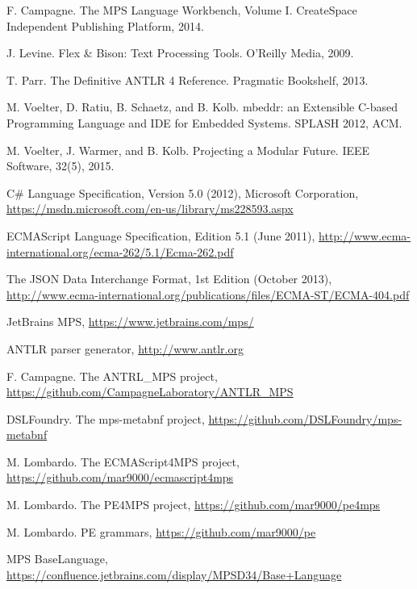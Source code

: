 \documentclass[preprint,10pt,numbers]{sigplanconf}
\begin{document}
\begin{thebibliography}{}

 F. Campagne. The MPS Language Workbench, Volume I. CreateSpace Independent Publishing Platform, 2014.

 J. Levine. Flex \& Bison: Text Processing Tools. O'Reilly Media, 2009.

 T. Parr. The Definitive ANTLR 4 Reference. Pragmatic Bookshelf, 2013.

 M. Voelter, D. Ratiu, B. Schaetz, and B. Kolb. mbeddr: an Extensible C-based Programming Language and IDE for Embedded Systems. SPLASH 2012, ACM.

 M. Voelter, J. Warmer, and B. Kolb. Projecting a Modular Future. IEEE Software, 32(5), 2015.

 C\# Language Specification, Version 5.0 (2012), Microsoft Corporation, \url{https://msdn.microsoft.com/en-us/library/ms228593.aspx}

 ECMAScript Language Specification, Edition 5.1 (June 2011), \url{http://www.ecma-international.org/ecma-262/5.1/Ecma-262.pdf}

 The JSON Data Interchange Format, 1st Edition (October 2013), \url{http://www.ecma-international.org/publications/files/ECMA-ST/ECMA-404.pdf}

 JetBrains MPS, \url{https://www.jetbrains.com/mps/}

 ANTLR parser generator, \url{http://www.antlr.org}

 F. Campagne. The ANTRL{\_}MPS project, \url{https://github.com/CampagneLaboratory/ANTLR_MPS}

 DSLFoundry. The mps-metabnf project, \url{https://github.com/DSLFoundry/mps-metabnf}

 M. Lombardo. The ECMAScript4MPS project, \url{https://github.com/mar9000/ecmascript4mps}

 M. Lombardo. The PE4MPS project, \url{https://github.com/mar9000/pe4mps}

 M. Lombardo. PE grammars, \url{https://github.com/mar9000/pe}

 MPS BaseLanguage, \url{https://confluence.jetbrains.com/display/MPSD34/Base+Language}

\end{thebibliography}
\end{document}

